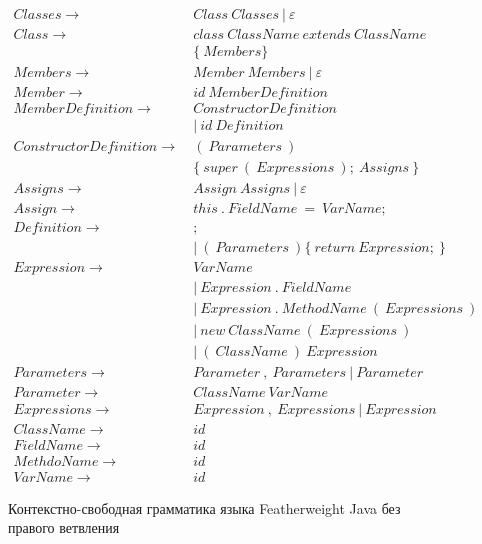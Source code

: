 \begin{figure}
    \begin{align*}
        Classes \rightarrow&\ Class\ Classes\ |\ \varepsilon\\
        Class \rightarrow&\ class\ ClassName\ extends\ ClassName\\
        &\ \{\ Members \}\\
        Members \rightarrow&\ Member\ Members\ |\ \varepsilon\\
        Member \rightarrow&\ id\ MemberDefinition\\
        MemberDefinition \rightarrow&\ ConstructorDefinition\\
        &\ |\ id\ Definition\\
        ConstructorDefinition \rightarrow&\ (\ Parameters\ )\\
        &\ \{\ super\ (\ Expressions\ );\ Assigns\ \}\\
        Assigns \rightarrow&\ Assign\ Assigns\ |\ \varepsilon\\
        Assign \rightarrow&\ this\ .\ FieldName\ =\ VarName;\\
        Definition \rightarrow&\ ;\\
        &\ |\ (\ Parameters\ ) \{\ return\ Expression;\ \}\\
        Expression \rightarrow&\ VarName\\
        &\ |\ Expression\ .\ FieldName\\
        &\ |\ Expression\ .\ MethodName\ (\ Expressions\ )\\
        &\ |\ new\ ClassName\ (\ Expressions\ )\\
        &\ |\ (\ ClassName\ )\ Expression\\
        Parameters \rightarrow&\ Parameter\ ,\ Parameters\ |\ Parameter\\
        Parameter \rightarrow&\ ClassName\ VarName\\
        Expressions \rightarrow&\ Expression\ ,\ Expressions\ |\ Expression\\
        ClassName \rightarrow&\ id\\
        FieldName \rightarrow&\ id\\
        MethdoName \rightarrow&\ id\\
        VarName \rightarrow&\ id
    \end{align*}
    \caption{Контекстно-свободная грамматика языка Featherweight Java без правого ветвления}
    \label{cf-fj-happy}
\end{figure}
